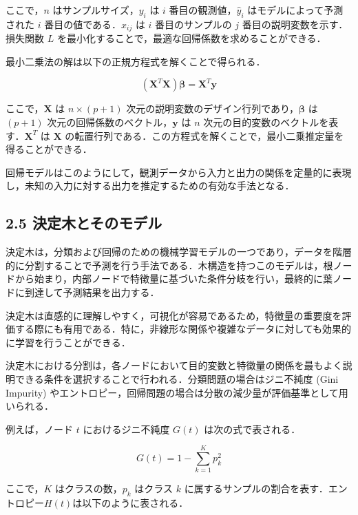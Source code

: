 \begin{itemize}
	ここで，$n$ はサンプルサイズ，$y_i$ は $i$ 番目の観測値，$\hat{y}_i$ はモデルによって予測された $i$ 番目の値である．$x_{ij}$ は $i$ 番目のサンプルの $j$ 番目の説明変数を示す．損失関数 $L$ を最小化することで，最適な回帰係数を求めることができる．
	
	最小二乗法の解は以下の正規方程式を解くことで得られる．
	
	\begin{equation}
		(\mathbf{X}^T \mathbf{X}) \mathbf{\beta} = \mathbf{X}^T \mathbf{y}
	\end{equation}
	
	ここで，$\mathbf{X}$ は $n \times (p+1)$ 次元の説明変数のデザイン行列であり，$\mathbf{\beta}$ は $(p+1)$ 次元の回帰係数のベクトル，$\mathbf{y}$ は $n$ 次元の目的変数のベクトルを表す．$\mathbf{X}^T$ は $\mathbf{X}$ の転置行列である．この方程式を解くことで，最小二乗推定量を得ることができる．
	
\end{itemize}
回帰モデルはこのようにして，観測データから入力と出力の関係を定量的に表現し，未知の入力に対する出力を推定するための有効な手法となる．


\subsection*{2.5 決定木とそのモデル}
決定木は，分類および回帰のための機械学習モデルの一つであり，データを階層的に分割することで予測を行う手法である\cite{prml}．木構造を持つこのモデルは，根ノードから始まり，内部ノードで特徴量に基づいた条件分岐を行い，最終的に葉ノードに到達して予測結果を出力する．

決定木は直感的に理解しやすく，可視化が容易であるため，特徴量の重要度を評価する際にも有用である．特に，非線形な関係や複雑なデータに対しても効果的に学習を行うことができる．

決定木における分割は，各ノードにおいて目的変数と特徴量の関係を最もよく説明できる条件を選択することで行われる．分類問題の場合はジニ不純度 (Gini Impurity) \cite{gini}やエントロピー，回帰問題の場合は分散の減少量が評価基準として用いられる．

例えば，ノード $t$ におけるジニ不純度 $G(t)$ は次の式で表される．

\begin{equation}
	G(t) = 1 - \sum_{k=1}^{K} p_k^2
\end{equation}

ここで，$K$ はクラスの数，$p_k$ はクラス $k$ に属するサンプルの割合を表す．エントロピー$H(t)$は以下のように表される．

